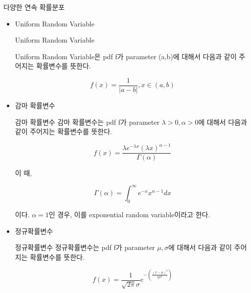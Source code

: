 \documentclass{beamer}
\begin{document}
\begin{frame}[allowframebreaks]{다양한 연속 확률분포} 
\begin{itemize} 

\item Uniform Random Variable 

\begin{block}{Uniform Random Variable}

Uniform Random Variable은 pdf f가 parameter (a,b)에 대해서 다음과 같이 주어지는 확률변수를 뜻한다. 

\begin{equation} 
f(x) = \frac{1}{|a-b|}, x \in (a,b)
\end{equation} 
\end{block}
\item 감마 확률변수

\begin{block}{감마 확률변수}
감마 확률변수는 pdf f가 parameter $\lambda>0, \alpha>0$에 대해서 다음과 같이 주어지는 확률변수를 뜻한다. 

\begin{equation} 
f(x) = \frac{\lambda e^{-\lambda x} (\lambda x)^{\alpha-1}}{\Gamma(\alpha)}
\end{equation} 

이 때, 

\begin{equation} 
\Gamma(\alpha) = \int^{\infty}_0 e^{-x} x^{\alpha-1} dx
\end{equation}

이다. $\alpha= 1$인 경우, 이를 exponential random variable이라고 한다. 
\end{block}



\item 정규확률변수
\begin{block}{정규확률변수}
정규확률변수는 pdf f가 parameter $\mu, \sigma$에 대해서 다음과 같이 주어지는 확률변수를 뜻한다. 

\begin{equation} 
f(x) = \frac{1}{\sqrt{2 \pi} \sigma} e^{-(\frac{(x-\mu)^2}{2 \sigma^2})}
\end{equation} 

\end{block}

\end{itemize} 
\end{frame}
\end{document}
